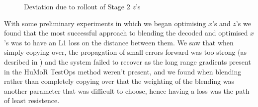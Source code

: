 \begin{figure}[!ht]
    \centering
    \hfil
    \hfil
    \hfil
    \caption{Deviation due to rollout of Stage 2 $z$'s}
    \label{fig:humor_stage_2_rollout_deviation}
\end{figure}


With some preliminary experiments in which we began optimising $x$'s and $z$'s we found that the most successful approach to blending the decoded and optimised $x$'s was to have an L1 loss on the distance between them. We saw that when simply copying over, the propagation of small errors forward was too strong (as desribed in ) and the system failed to recover as the long range gradients present in the HuMoR TestOps method weren't present, and we found when blending rather than completely copying over that the weighting of the blending was another parameter that was difficult to choose, hence having a loss was the path of least resistence.

